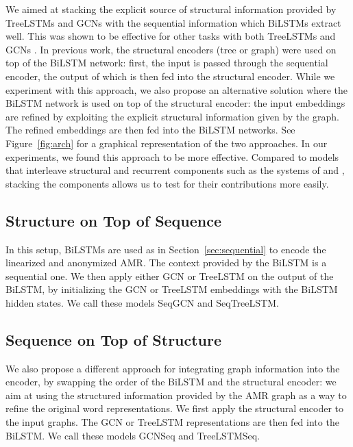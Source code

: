 \documentclass[11pt,a4paper]{article}
\begin{document}
We aimed at stacking the explicit source of structural information provided by TreeLSTMs and GCNs with the sequential information which BiLSTMs extract well. 
This was shown to be effective for other tasks with both TreeLSTMs \cite{eriguchi2016tree,chen2017improved} and GCNs \cite{marcheggiani2017encoding,cetoli2017graph,bastings2017graph}. In previous work, the structural encoders (tree or graph) were used on top of the BiLSTM network: first, the input is passed through the sequential encoder, the output of which is then fed into the structural encoder. While we experiment with this approach, we also propose an alternative solution where the BiLSTM network is used on top of the structural encoder: the input embeddings are refined by exploiting the explicit structural information given by the graph. The refined embeddings are then fed into the BiLSTM networks. See Figure~\ref{fig:arch} for a graphical representation of the two approaches. In our experiments, we found this approach to be more effective. Compared to models that interleave structural and recurrent components such as the systems of  and , stacking the components allows us to test for their contributions more easily.

\subsection{Structure on Top of Sequence}
\label{sec:ontopofbilstm}
In this setup, BiLSTMs are used as in Section~\ref{sec:sequential} to encode the linearized and anonymized AMR.
The context provided by the BiLSTM is a sequential one. We then apply either GCN or TreeLSTM on the output of the BiLSTM, by initializing the GCN or TreeLSTM embeddings with the BiLSTM hidden states. We call these models {\sc SeqGCN} and \nohyphens{{\sc SeqTreeLSTM}}.






\subsection{Sequence on Top of Structure}
\label{sec:bilstmontop}

We also propose a different approach for integrating graph information into the encoder, by swapping the order of the BiLSTM and the structural encoder: we aim at using the structured information provided by the AMR graph as a way to refine the original word representations. We first apply the structural encoder to the input graphs. The GCN or TreeLSTM representations are then fed into the BiLSTM. We call these models {\sc GCNSeq} and {\sc TreeLSTMSeq}. 
\end{document}
